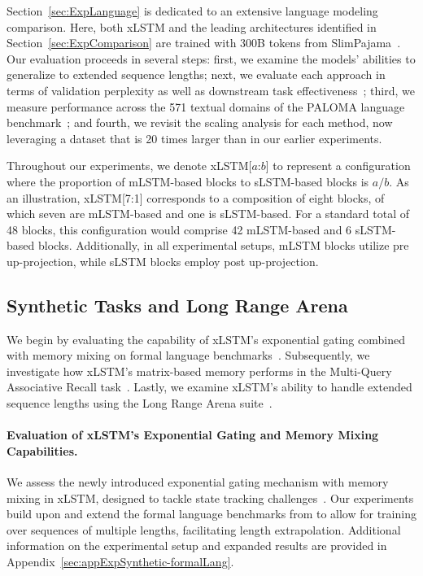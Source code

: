 Section~\ref{sec:ExpLanguage} is dedicated to an extensive language modeling comparison. Here, both xLSTM and the leading architectures identified in Section~\ref{sec:ExpComparison} are trained with 300B tokens from SlimPajama~\citep{Soboleva:23}. Our evaluation proceeds in several steps: first, we examine the models’ abilities to generalize to extended sequence lengths; next, we evaluate each approach in terms of validation perplexity as well as downstream task effectiveness~\citep{Sutawika:24}; third, we measure performance across the 571 textual domains of the PALOMA language benchmark~\citep{Magnusson:23arxivshort}; and fourth, we revisit the scaling analysis for each method, now leveraging a dataset that is 20 times larger than in our earlier experiments.

\label{sec:xlstm_blocks_notation}
Throughout our experiments, we denote xLSTM[$a$:$b$] to represent a configuration where the proportion of mLSTM-based blocks to sLSTM-based blocks is $a/b$. As an illustration, xLSTM[7:1] corresponds to a composition of eight blocks, of which seven are mLSTM-based and one is sLSTM-based. For a standard total of 48 blocks, this configuration would comprise 42 mLSTM-based and 6 sLSTM-based blocks. Additionally, in all experimental setups, mLSTM blocks utilize pre up-projection, while sLSTM blocks employ post up-projection.

\subsection{Synthetic Tasks and Long Range Arena}
\label{sec:ExpSyntethic}
We begin by evaluating the capability of xLSTM’s exponential gating combined with memory mixing on formal language benchmarks~\citep{Deletang:23}. Subsequently, we investigate how xLSTM’s matrix-based memory performs in the Multi-Query Associative Recall task~\citep{Arora:23arxiv}. Lastly, we examine xLSTM’s ability to handle extended sequence lengths using the Long Range Arena suite~\citep{Tay:21}.

\paragraph{Evaluation of xLSTM’s Exponential Gating and Memory Mixing Capabilities.} We assess the newly introduced exponential gating mechanism with memory mixing in xLSTM, designed to tackle state tracking challenges~\citep{Merrill:24, Merrill:23}. Our experiments build upon and extend the formal language benchmarks from \citet{Deletang:23} to allow for training over sequences of multiple lengths, facilitating length extrapolation. Additional information on the experimental setup and expanded results are provided in Appendix~\ref{sec:appExpSynthetic-formalLang}. 

